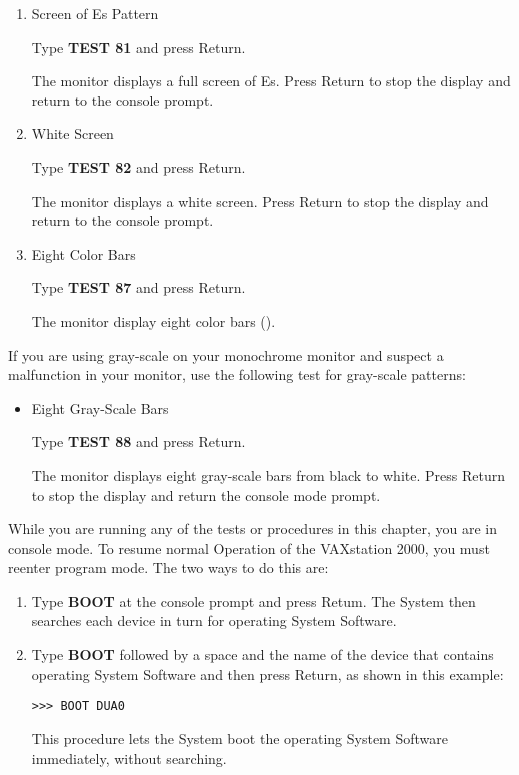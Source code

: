\documentclass{dec}
\begin{document}
\begin{enumerate}
\item Screen of Es Pattern

Type \textbf{TEST 81} and press Return.

The monitor displays a full screen of Es. Press Return to stop the display and return to the console prompt.

\item White Screen

Type \textbf{TEST 82} and press Return.

The monitor displays a white screen. Press Return to stop the display and return to the console prompt.

\item Eight Color Bars

Type \textbf{TEST 87} and press Return.

The monitor display eight color bars ().
\end{enumerate}



If you are using gray-scale on your monochrome monitor and suspect a
malfunction in your monitor, use the following test for gray-scale patterns:
\begin{itemize}
\item Eight Gray-Scale Bars

Type \textbf{TEST 88} and press Return.

The monitor displays eight gray-scale bars from black to white.
 Press Return to stop the display and return the console mode prompt.
\end{itemize}


While you are running any of the tests or procedures in this chapter, you are
in console mode. To resume normal Operation of the VAXstation 2000, you
must reenter program mode. The two ways to do this are:

\begin{enumerate}
\item Type \textbf{BOOT} at the console prompt and press Retum. The System then
searches each device in turn for operating System Software.

\item Type \textbf{BOOT} followed by a space and the name of the device that
contains operating System Software and then press Return, as shown in
this example:

{\tt >>> BOOT DUA0}

This procedure lets the System boot the operating System Software immediately, without searching.

\end{enumerate}
\end{document}
